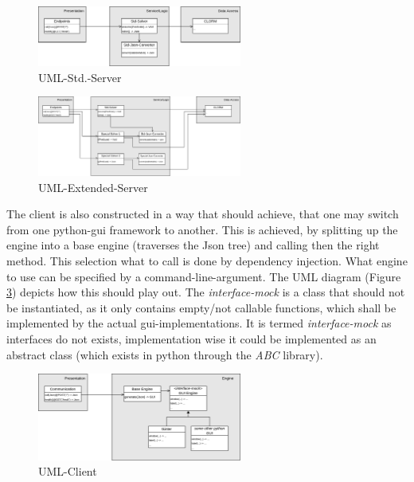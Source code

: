 \documentclass[12pt,a4paper]{article}
\newcommand{\<}[1]{\guilsinglleft}
\renewcommand{\>}[1]{\guilsinglright}
\begin{document}
\begin{figure}[ht]
    \begin{center}
    \includegraphics[width=0.6\textwidth]{imgs/uml-std-server.png}
    \caption{UML-Std.-Server}
    \label{fig:uml-std-server}
    \end{center}
\end{figure}

\begin{figure}[ht]
    \begin{center}
    \includegraphics[width=0.6\textwidth]{imgs/uml-extended-server.png}
    \caption{UML-Extended-Server}
    \label{fig:uml-extended-server}
    \end{center}
\end{figure}


\noindent The client is also constructed in a way that should achieve, that one may switch from one python-gui framework to another. This is achieved, by splitting up the engine into a base engine (traverses the Json tree) and calling then the right method. This selection what to call is done by dependency injection. What engine to use can be specified by a command-line-argument. The UML diagram (Figure \ref{fig:uml-client}) depicts how this should play out. The \textit{interface-mock} is a class that should not be instantiated, as it only contains empty/not callable functions, which shall be implemented by the actual gui-implementations. It is termed \textit{interface-mock} as interfaces do not exists, implementation wise it could be implemented as an abstract class (which exists in python through the \textit{ABC} library).

\begin{figure}[ht]
    \begin{center}
    \includegraphics[width=0.6\textwidth]{imgs/uml-client.png}
    \caption{UML-Client}
    \label{fig:uml-client}
    \end{center}
\end{figure}
\end{document}
